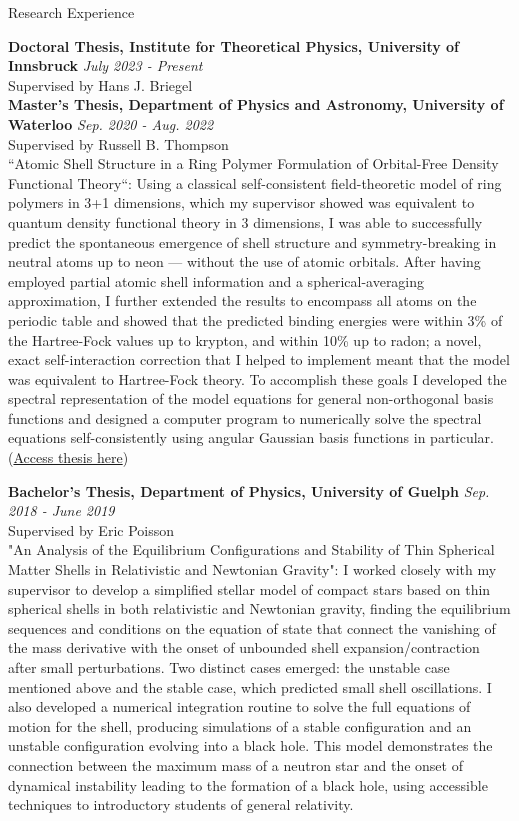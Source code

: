 \documentclass{resume} %
\begin{document}
\begin{rSection}{Research Experience}

{\bf Doctoral Thesis, Institute for Theoretical Physics, University of Innsbruck} \hfill{\textit{July 2023 - Present}}\\
Supervised by Hans J. Briegel\\

{\bf Master's Thesis, Department of Physics and Astronomy, University of Waterloo} \hfill{\textit{Sep. 2020 - Aug. 2022}}\\
Supervised by Russell B. Thompson\\
``Atomic Shell Structure in a Ring Polymer Formulation of Orbital-Free Density Functional Theory``: Using a classical self-consistent field-theoretic model of ring polymers in 3+1 dimensions, which my supervisor showed was equivalent to quantum density functional theory in 3 dimensions, I was able to successfully predict the spontaneous emergence of shell structure and symmetry-breaking in neutral atoms up to neon --- without the use of atomic orbitals. After having employed partial atomic shell information and a spherical-averaging approximation, I further extended the results to encompass all atoms on the periodic table and showed that the predicted binding energies were within 3\% of the Hartree-Fock values up to krypton, and within 10\% up to radon; a novel, exact self-interaction correction that I helped to implement meant that the model was equivalent to Hartree-Fock theory. To accomplish these goals I developed the spectral representation of the model equations for general non-orthogonal basis functions and designed a computer program to numerically solve the spectral equations self-consistently using angular Gaussian basis functions in particular.
(\href{https://uwspace.uwaterloo.ca/handle/10012/18577}{Access thesis here})

{\bf Bachelor's Thesis, Department of Physics, University of Guelph} \hfill{\textit{Sep. 2018 - June 2019}}\\
Supervised by Eric Poisson\\
"An Analysis of the Equilibrium Configurations and Stability of Thin Spherical Matter Shells in Relativistic and Newtonian Gravity": I worked closely with my supervisor to develop a simplified stellar model of compact stars based on thin spherical shells in both relativistic and Newtonian gravity, finding the equilibrium sequences and conditions on the equation of state that connect the vanishing of the mass derivative with the onset of unbounded shell expansion/contraction after small perturbations. Two distinct cases emerged: the unstable case mentioned above and the stable case, which predicted small shell oscillations. I also developed a numerical integration routine to solve the full equations of motion for the shell, producing simulations of a stable configuration and an unstable configuration evolving into a black hole. This model demonstrates the connection between the maximum mass of a neutron star and the onset of dynamical instability leading to the formation of a black hole, using accessible techniques to introductory students of general relativity.

\end{rSection}
\end{document}

